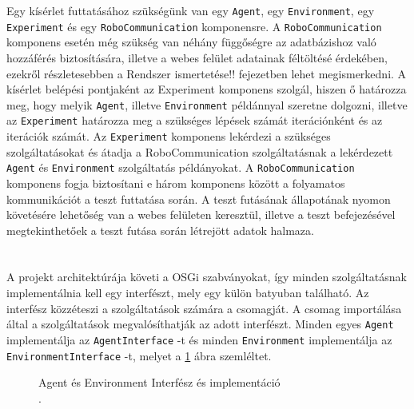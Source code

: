 Egy kísérlet futtatásához szükségünk van egy \texttt{Agent}, egy \texttt{Environment}, egy \texttt{Experiment} és egy \texttt{RoboCommunication} komponensre. A \texttt{RoboCommunication} komponens esetén még szükség van néhány függőségre az adatbázishoz való hozzáférés biztosítására, illetve a webes felület adatainak féltöltésé érdekében, ezekről részletesebben a Rendszer ismertetése!! fejezetben lehet megismerkedni. A kísérlet belépési pontjaként az Experiment komponens szolgál, hiszen ő határozza meg, hogy melyik \texttt{Agent}, illetve \texttt{Environment} példánnyal szeretne dolgozni, illetve az \texttt{Experiment} határozza meg a szükséges lépések számát iterációnként és az iterációk számát. Az \texttt{Experiment} komponens lekérdezi a szükséges szolgáltatásokat és átadja a RoboCommunication szolgáltatásnak a lekérdezett \texttt{Agent} és \texttt{Environment} szolgáltatás példányokat. A \texttt{RoboCommunication} komponens fogja biztosítani e három komponens között a folyamatos kommunikációt a teszt futtatása során. A teszt futásának állapotának nyomon követésére lehetőség van a webes felületen keresztül, illetve a teszt befejezésével megtekinthetőek a teszt futása során létrejött adatok halmaza.
\\
\\
\\
	A projekt architektúrája követi a OSGi szabványokat, így minden szolgáltatásnak implementálnia kell egy interfészt, mely egy külön batyuban található. Az interfész közzéteszi a szolgáltatások számára a csomagját. A csomag importálása által a szolgáltatások megvalósíthatják az adott interfészt. Minden egyes \texttt{Agent} implementálja az \texttt{AgentInterface} -t és minden \texttt{Environment} implementálja az \texttt{EnvironmentInterface} -t, melyet a \ref{fig:alapUML} ábra szemléltet.

\begin{figure}[h]
  \centering
  \caption[Példa képek beszúrására]%
  {Agent és Environment Interfész és implementáció\\
  {\white .}\hfill\url{}}
  \label{fig:alapUML}
\end{figure}


